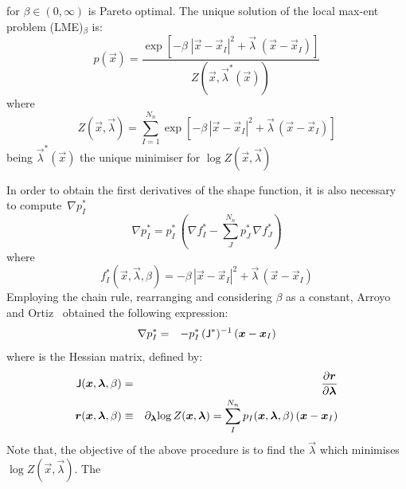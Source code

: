 for $\beta \in (0,\infty)$ is Pareto optimal. The unique solution of
the local max-ent problem (LME)$_\beta$ is: 
\begin{equation}
  \label{eq:LME-p}
p(\vec{x})=\frac{\exp\left[ -\beta \; |\vec{x}-\vec{x}_I|^2 +  \vec{\lambda}  \;  (\vec{x}-\vec{x}_I)         \right] } {Z(\vec{x},\vec{\lambda}^*(\vec{x}))}
\end{equation}
where
\begin{equation}
  \label{eq:LME-Z}
Z(\vec{x}, {\vec{\lambda}}) = \sum_{I=1}^{N_n}{ \exp \left[ -\beta \, | \vec{x}-\vec{x}_I|^2 + \vec{\lambda}  \,  (\vec{x}-\vec{x}_I)  \right]}
\end{equation}
being $\vec{\lambda}^*(\vec{x})$ the unique minimiser  for $\log Z(\vec{x}, \vec{\lambda})$

In order to obtain the first derivatives of the shape function, it is  also necessary to compute~$\nabla p^*_I$ 
\begin{equation}
  \label{eq:LME-grad-p}
\nabla p^*_I=p^*_I  \, \left(\nabla f^*_I-\sum_J^{N_n} p^*_J \, \nabla f^*_J\right)
\end{equation}
where
\begin{equation}
  \label{eq:LME-f}
f^*_I(\vec{x},  \vec{\lambda},\beta)=-\beta \, |\vec{x}-\vec{x}_I|^2 + \vec{\lambda}   \,  (\vec{x}-\vec{x}_I)
\end{equation}
Employing the chain rule, rearranging and considering $\beta$ as a constant, Arroyo and Ortiz~\cite{Arroyo2006} obtained the following expression:
\begin{eqnarray}
\nabla p^*_I &=& -p^*_I \,  (\tens{J}^*)^{-1} \,  (\vec{x} - \vec{x}_I) \label{eq26} 
\end{eqnarray}
where  is the Hessian matrix, defined by:
\begin{eqnarray}
\tens{J}(\vec{x},  \vec{\lambda},\beta) &=& \frac{\partial \vec{r}}{\partial  \vec{\lambda}} \label{eq27} \\ 
\vec{r}(\vec{x},\vec{\lambda},\beta) &\equiv& \partial_{\vec{\lambda}}{\log{ Z( \vec{x},\vec{\lambda}})} 
  =\sum_I^{N_n} p_I(\vec{x},\vec{\lambda},\beta) \, (\vec{x} - \vec{x}_I) \label{eq28} 
\end{eqnarray}
Note that, the objective of the above procedure is to find the
$\vec{\lambda}$ which minimises  $\log Z(\vec{x}, \vec{\lambda})$. The
